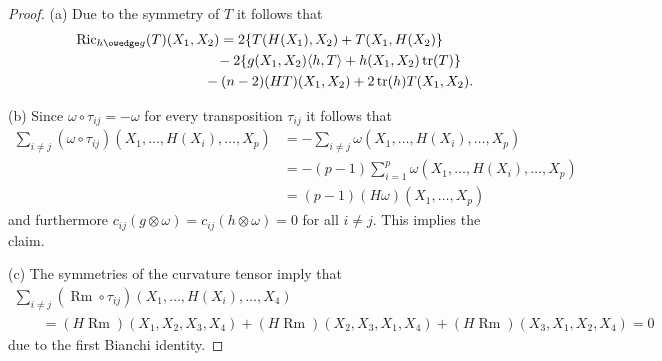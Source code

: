 \documentclass[10pt,a4paper]{amsart}
\numberwithin{equation}{section}
\newcommand{\Ric} {\operatorname{Ric}}
\newcommand{ \tr } {\operatorname{tr}}
\newcommand{\Rm} {\operatorname{Rm}}
\begin{document}
\begin{proof}
(a) Due to the symmetry of $T$ it follows that
\begin{gather*}
\Ric_{h \owedge g}(T)(X_1,X_2) =   2 \lbrace T(H(X_1), X_2) + T(X_1, H(X_2) \rbrace \\
\hphantom{\Ric_{h \owedge g}(T)(X_1,X_2) =}{} - 2 \lbrace g(X_1, X_2) \langle h, T \rangle + h(X_1, X_2) \tr(T) \rbrace \\
\hphantom{\Ric_{h \owedge g}(T)(X_1,X_2) =}{} - (n-2) (HT)(X_1, X_2) + 2 \tr(h) T(X_1, X_2).
\end{gather*}

(b) Since $\omega \circ \tau_{ij} = - \omega$ for every transposition $\tau_{ij}$ it follows that
\begin{align*}
\sum_{i \neq j} (\omega \circ \tau_{ij})(X_1, \dots, H(X_i), \dots, X_p)& =
  - \sum_{i \neq j} \omega(X_1, \dots, H(X_i), \dots, X_p) \\
& =   - (p-1) \sum_{i=1}^p \omega(X_1, \dots, H(X_i), \dots, X_p) \\
& =   (p-1) (H \omega)(X_1, \dots, X_p)
\end{align*}
and furthermore $c_{ij}(g \otimes \omega) = c_{ij}(h \otimes \omega)=0$ for all $i \neq j$. This implies the claim.

(c) The symmetries of the curvature tensor imply that
\begin{gather*}
  \sum_{i \neq j} ( \Rm \circ \tau_{ij} )(X_1, \dots, H(X_i), \dots, X_4)   \\
\!\!\qquad{}= (H \Rm)(X_1, X_2, X_3, X_4) + (H \Rm)( X_2, X_3, X_1, X_4) + (H \Rm)( X_3, X_1, X_2, X_4)=0
\end{gather*}
due to the first Bianchi identity.


\end{proof}
\end{document}
